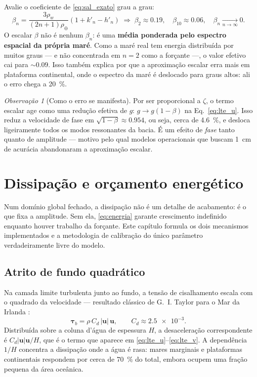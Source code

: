 \documentclass[11pt,a4paper,oneside]{report}
\theoremstyle{definition}
\theoremstyle{plain}
\theoremstyle{remark}
\newtheorem{observacao}[definicao]{Observação}
\newcommand{\vect}[1]{\bm{#1}}
\begin{document}
\begin{caixa}
Avalie o coeficiente de \eqref{eq:sal_exato} grau a grau:
\begin{equation}
\beta_n=\frac{3\rho_w}{(2n+1)\rho_\oplus}\left(1+k'_n-h'_n\right)
\;\Longrightarrow\;
\beta_2\approx\num{0.19},\quad
\beta_{10}\approx\num{0.06},\quad
\beta_n\xrightarrow[n\to\infty]{}0 .
\end{equation}
O escalar $\beta$ não é nenhum $\beta_n$: é uma \textbf{média ponderada pelo
espectro espacial da própria maré}. Como a maré real tem energia distribuída
por muitos graus — e não concentrada em $n=2$ como a forçante —, o valor
efetivo cai para $\sim\!\num{0.09}$. Isso também explica por que a aproximação
escalar erra mais em plataforma continental, onde o espectro da maré é
deslocado para graus altos: ali o erro chega a \SI{20}{\percent}.
\end{caixa}

\begin{observacao}[Como o erro se manifesta]
Por ser proporcional a $\zeta$, o termo escalar age como uma redução efetiva de
$g$: $g\to g(1-\beta)$ na Eq.~\eqref{eq:lte_u}. Isso reduz a velocidade de fase
em $\sqrt{1-\beta}\approx\num{0.954}$, ou seja, cerca de \SI{4.6}{\percent}, e
desloca ligeiramente todos os modos ressonantes da bacia. É um efeito de
\emph{fase} tanto quanto de amplitude — motivo pelo qual modelos operacionais
que buscam \SI{1}{\centi\meter} de acurácia abandonaram a aproximação escalar.
\end{observacao}

\chapter{Dissipação e orçamento energético}
\label{cap:dissipacao}

Num domínio global fechado, a dissipação não é um detalhe de acabamento: é o
que fixa a amplitude. Sem ela, \eqref{eq:energia} garante crescimento
indefinido enquanto houver trabalho da forçante. Este capítulo formula os dois
mecanismos implementados e a metodologia de calibração do único parâmetro
verdadeiramente livre do modelo.

\section{Atrito de fundo quadrático}

Na camada limite turbulenta junto ao fundo, a tensão de cisalhamento escala com
o quadrado da velocidade — resultado clássico de G.~I. Taylor para o Mar da
Irlanda \cite{taylor1919}:
\begin{equation}
\vect{\tau}_b=\rho\,C_d\,|\vect{u}|\,\vect{u},
\qquad C_d\approx\num{2.5e-3}.
\end{equation}
Distribuída sobre a coluna d'água de espessura $H$, a desaceleração
correspondente é $C_d|\vect{u}|\vect{u}/H$, que é o termo que aparece em
\eqref{eq:lte_u}--\eqref{eq:lte_v}. A dependência $1/H$ concentra a dissipação
onde a água é rasa: mares marginais e plataformas continentais respondem por
cerca de \SI{70}{\percent} do total, embora ocupem uma fração pequena da área
oceânica.
\end{document}
